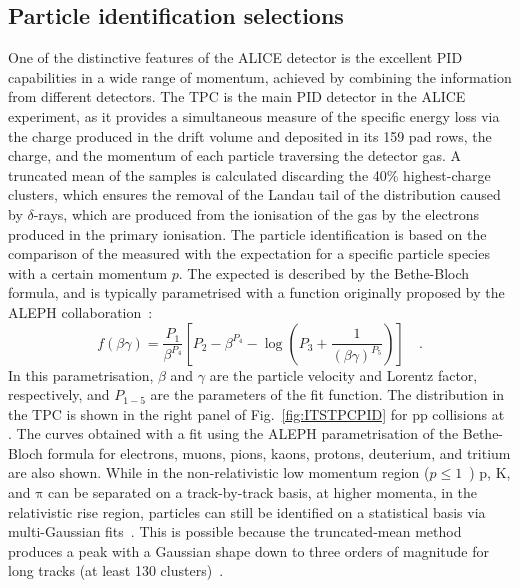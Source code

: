 \subsection{Particle identification selections}\label{sec:PIDselections}
One of the distinctive features of the ALICE detector is the excellent PID capabilities in a wide range of momentum, achieved by combining the information from different detectors. 
The TPC is the main PID detector in the ALICE experiment, as it provides a simultaneous measure of the specific energy loss via the charge produced in the drift volume and deposited in its 159 pad rows, the charge, and the momentum of each particle traversing the detector gas. A truncated mean of the \dedx samples is calculated discarding the 40\% highest-charge clusters, which ensures the removal of the Landau tail of the \dedx distribution caused by $\delta$-rays, which are produced from the ionisation of the gas by the electrons produced in the primary ionisation. The particle identification is based on the comparison of the measured \dedx with the expectation for a specific particle species with a certain momentum $p$. The expected \dedx is described by the Bethe-Bloch formula, and is typically parametrised with a function originally proposed by the ALEPH collaboration~\cite{Blum:2008nqe}:
\begin{equation*}
    f(\beta\gamma) = \frac{P_1}{\beta^{P_4}}\left[P_2 - \beta^{P_4} - \log\left(P_3 + \frac{1}{(\beta\gamma)^{P_5}}\right)\right]\quad .
\end{equation*}
In this parametrisation, $\beta$ and $\gamma$ are the particle velocity and Lorentz factor, respectively, and $P_{1-5}$ are the parameters of the fit function. The \dedx distribution in the TPC is shown in the right panel of Fig.~\ref{fig:ITSTPCPID} for pp collisions at \thirteen. The curves obtained with a fit using the ALEPH parametrisation of the Bethe-Bloch formula for electrons, muons, pions, kaons, protons, deuterium, and tritium are also shown. While in the non-relativistic low momentum region ($p \leq 1$~\gevc) p, K, and $\mathrm{\pi}$ can be separated on a track-by-track basis, at higher momenta, in the relativistic rise region, particles can still be identified on a statistical basis via multi-Gaussian fits~\cite{ALICE:2014sbx}. This is possible because the truncated-mean method produces a \dedx peak with a Gaussian shape down to three orders of magnitude for long tracks (at least 130 clusters)~\cite{ALICE:2014sbx}.
